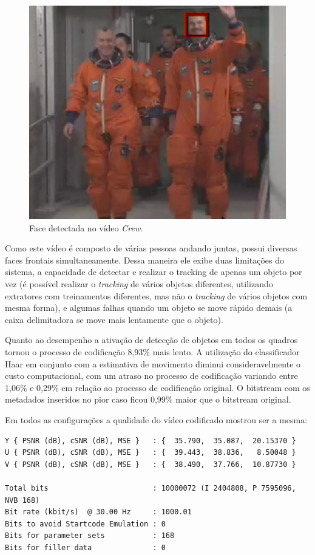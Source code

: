 \begin{figure}[H]
\centering
\includegraphics[scale=0.6]{imagens/fig22.eps}
\caption{Face detectada no vídeo \textit{Crew}.}
\label{fig:crew_example}
\end{figure}


Como este vídeo é composto de várias pessoas andando juntas, possui diversas faces frontais simultaneamente. Dessa maneira ele exibe duas limitações do sistema, a capacidade de detectar e realizar o tracking de apenas um objeto por vez (é possível realizar o \textit{tracking} de vários objetos diferentes, utilizando extratores com treinamentos diferentes, mas não o \textit{tracking} de vários objetos com mesma forma), e algumas falhas quando um objeto se move rápido demais (a caixa delimitadora se move mais lentamente que o objeto). 

Quanto ao desempenho a ativação de detecção de objetos em todos os quadros tornou o processo de codificação 8,93\% mais lento. A utilização do classificador Haar em conjunto com a estimativa de movimento diminui consideravelmente o custo computacional, com um atraso no processo de codificação variando entre 1,06\% e 0,29\% em relação ao processo de codificação original. O bitstream com os metadados inseridos no pior caso ficou 0,99\% maior que o bitstream original.


Em todos as configurações a qualidade do vídeo codificado mostrou ser a mesma:

\begin{lstlisting}
Y { PSNR (dB), cSNR (dB), MSE }   : {  35.790,  35.087,  20.15370 }
U { PSNR (dB), cSNR (dB), MSE }   : {  39.443,  38.836,   8.50048 }
V { PSNR (dB), cSNR (dB), MSE }   : {  38.490,  37.766,  10.87730 }

Total bits                        : 10000072 (I 2404808, P 7595096, NVB 168) 
Bit rate (kbit/s)  @ 30.00 Hz     : 1000.01
Bits to avoid Startcode Emulation : 0 
Bits for parameter sets           : 168 
Bits for filler data              : 0
\end{lstlisting}


